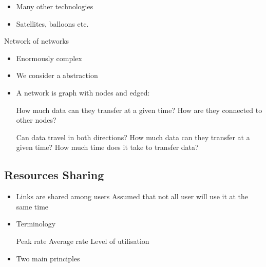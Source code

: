 \begin{itemize}
\begin{itemize}
\begin{itemize}
                    \end{itemize}
                    \begin{itemize}
                        \item Many other technologies
                        \item Satellites, balloons etc.
                    \end{itemize}
        \end{itemize}
     Network of networks
        \begin{itemize}
            \item Enormously complex
            \item We consider a abstraction
            \item A network is graph with nodes and edged:
                \begin{itemize}
                        \begin{itemize}
                             How much data can they transfer at a given time?
                             How are they connected to other nodes?
                        \end{itemize}
                        \begin{itemize}
                             Can data travel in both directions?
                             How much data can they transfer at a given time?
                             How much time does it take to transfer data?
                        \end{itemize}
                \end{itemize}
        \end{itemize}
\end{itemize}

\subsection{Resources Sharing}
\begin{itemize}
    \item Links are shared among users
     Assumed that not all user will use it at the same time
    \item Terminology
        \begin{itemize}
             Peak rate
             Average rate
             Level of utilisation
        \end{itemize}
    \item Two main principles
\end{itemize}

